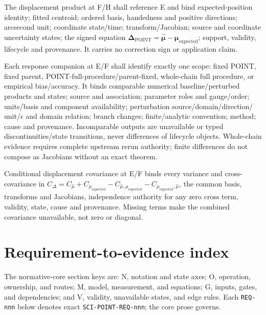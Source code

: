 \documentclass[11pt]{article}
\begin{document}
The displacement product at F/H shall reference E and bind expected-position
identity; fitted centroid; ordered basis, handedness and positive directions;
arcsecond unit; coordinate state/time; transform/Jacobian; source and
coordinate uncertainty states; the signed equation
$\boldsymbol{\Delta}_{\mathrm{POINT}}=\widehat{\boldsymbol{\mu}}-
\boldsymbol{\mu}_{\mathrm{expected}}$; support, validity, lifecycle and
provenance. It carries no correction sign or application claim.

Each response companion at E/F shall identify exactly one scope: fixed POINT,
fixed parent, POINT-full-procedure/parent-fixed, whole-chain full procedure, or
empirical bias/accuracy. It binds comparable numerical baseline/perturbed
products and states; source and association; parameter roles and gauge/order;
units/basis and component availability; perturbation source/domain/direction/
unit/$\epsilon$ and domain relation; branch changes; finite/analytic
convention; method; cause and provenance. Incomparable outputs are unavailable
or typed discontinuities/state transitions, never differences of lifecycle
objects. Whole-chain evidence requires complete upstream rerun authority;
finite differences do not compose as Jacobians without an exact theorem.

Conditional displacement covariance at E/F binds every variance and
cross-covariance in
$C_{\Delta}=C_{\widehat\mu}+C_{\mu_{\mathrm{expected}}}
-C_{\widehat\mu,\mu_{\mathrm{expected}}}
-C_{\mu_{\mathrm{expected}},\widehat\mu}$, the common basis, transforms and
Jacobians, independence authority for any zero cross term, validity, state,
cause and provenance. Missing terms make the combined covariance unavailable,
not zero or diagonal.

\section{Requirement-to-evidence index}

The normative-core section keys are: N, notation and state axes; O, operation,
ownership, and routes; M, model, measurement, and equations; G, inputs, gates,
and dependencies; and V, validity, unavailable states, and edge rules. Each
\texttt{REQ-nnn} below denotes exact \texttt{SCI-POINT-REQ-nnn}; the core
prose governs.
\end{document}
